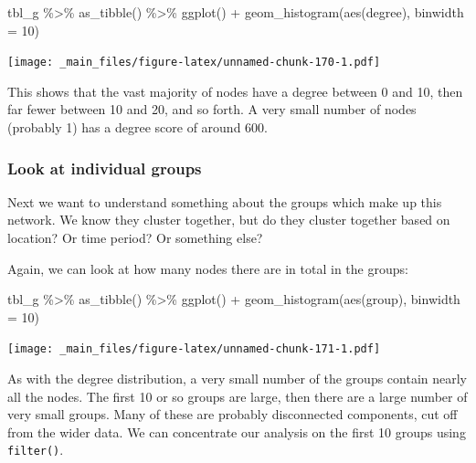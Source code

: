 \documentclass[
]{book}
\newenvironment{Shaded}{\begin{snugshade}}{\end{snugshade}}
\newcommand{\AttributeTok}[1]{\textcolor[rgb]{0.77,0.63,0.00}{#1}}
\newcommand{\DecValTok}[1]{\textcolor[rgb]{0.00,0.00,0.81}{#1}}
\newcommand{\FunctionTok}[1]{\textcolor[rgb]{0.00,0.00,0.00}{#1}}
\newcommand{\NormalTok}[1]{#1}
\newcommand{\SpecialCharTok}[1]{\textcolor[rgb]{0.00,0.00,0.00}{#1}}
\begin{document}
\begin{Shaded}
\begin{Highlighting}[]
\NormalTok{tbl\_g }\SpecialCharTok{\%\textgreater{}\%} \FunctionTok{as\_tibble}\NormalTok{() }\SpecialCharTok{\%\textgreater{}\%} 
  \FunctionTok{ggplot}\NormalTok{() }\SpecialCharTok{+} 
  \FunctionTok{geom\_histogram}\NormalTok{(}\FunctionTok{aes}\NormalTok{(degree), }\AttributeTok{binwidth =} \DecValTok{10}\NormalTok{)}
\end{Highlighting}
\end{Shaded}

\texttt{[image: \_main\_files/figure-latex/unnamed-chunk-170-1.pdf]}

This shows that the vast majority of nodes have a degree between 0 and 10, then far fewer between 10 and 20, and so forth. A very small number of nodes (probably 1) has a degree score of around 600.

\hypertarget{look-at-individual-groups}{%
\subsubsection{Look at individual groups}\label{look-at-individual-groups}}

Next we want to understand something about the groups which make up this network. We know they cluster together, but do they cluster together based on location? Or time period? Or something else?

Again, we can look at how many nodes there are in total in the groups:

\begin{Shaded}
\begin{Highlighting}[]
\NormalTok{tbl\_g }\SpecialCharTok{\%\textgreater{}\%} \FunctionTok{as\_tibble}\NormalTok{() }\SpecialCharTok{\%\textgreater{}\%} \FunctionTok{ggplot}\NormalTok{() }\SpecialCharTok{+} \FunctionTok{geom\_histogram}\NormalTok{(}\FunctionTok{aes}\NormalTok{(group), }\AttributeTok{binwidth =} \DecValTok{10}\NormalTok{)}
\end{Highlighting}
\end{Shaded}

\texttt{[image: \_main\_files/figure-latex/unnamed-chunk-171-1.pdf]}

As with the degree distribution, a very small number of the groups contain nearly all the nodes. The first 10 or so groups are large, then there are a large number of very small groups. Many of these are probably disconnected components, cut off from the wider data. We can concentrate our analysis on the first 10 groups using \texttt{filter()}.
\end{document}
